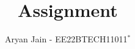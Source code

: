 \documentclass[journal,12pt,onecolumn]{IEEEtran}
\theoremstyle{remark}
\begin{document}
%




\vspace{3cm}

\title{
Assignment
}
\author{ Aryan Jain - EE22BTECH11011$^{*}$%
}	


%
%
%

% 
%



% 
\end{document}
